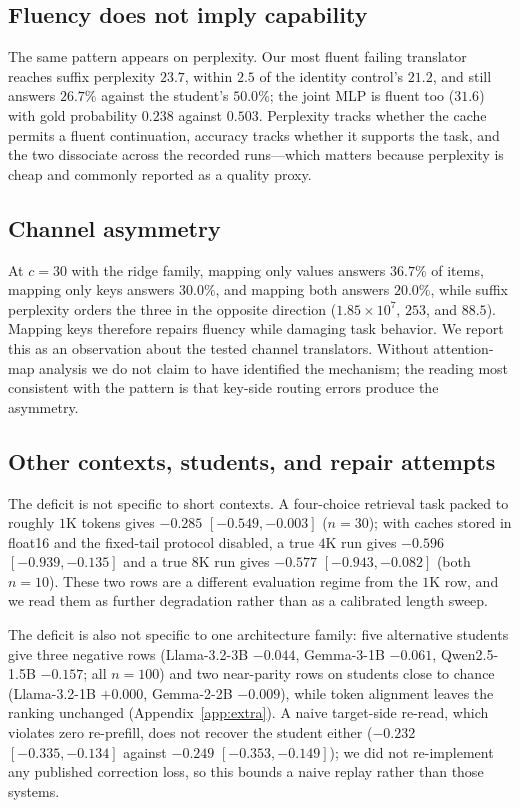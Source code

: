 \documentclass[10pt]{article}
\begin{document}
\subsection{Fluency does not imply capability}
The same pattern appears on perplexity. Our most fluent failing translator
reaches suffix perplexity $23.7$, within $2.5$ of the identity control's $21.2$,
and still answers $26.7\%$ against the student's $50.0\%$; the joint MLP is
fluent too ($31.6$) with gold probability $0.238$ against $0.503$. Perplexity
tracks whether the cache permits a fluent continuation, accuracy tracks whether
it supports the task, and the two dissociate across the recorded runs---which
matters because perplexity is cheap and commonly reported as a quality proxy.

\subsection{Channel asymmetry}
At $c{=}30$ with the ridge family, mapping only values answers $36.7\%$ of
items, mapping only keys answers $30.0\%$, and mapping both answers $20.0\%$,
while suffix perplexity orders the three in the opposite direction
($1.85\times10^{7}$, $253$, and $88.5$). Mapping keys therefore repairs fluency
while damaging task behavior. We report this as an observation about the tested
channel translators. Without attention-map analysis we do not claim to have
identified the mechanism; the reading most consistent with the pattern is that
key-side routing errors produce the asymmetry.

\subsection{Other contexts, students, and repair attempts}
The deficit is not specific to short contexts. A four-choice retrieval task
packed to roughly $1$K tokens gives $-0.285$ $[-0.549,-0.003]$ ($n{=}30$);
with caches stored in float16 and the fixed-tail protocol disabled, a true
$4$K run gives $-0.596$ $[-0.939,-0.135]$ and a true $8$K run gives $-0.577$
$[-0.943,-0.082]$ (both $n{=}10$). These two rows are a different evaluation
regime from the $1$K row, and we read them as further degradation rather than as
a calibrated length sweep.

The deficit is also not specific to one architecture family: five alternative
students give three negative rows (Llama-3.2-3B $-0.044$, Gemma-3-1B $-0.061$,
Qwen2.5-1.5B $-0.157$; all $n{=}100$) and two near-parity rows on students
close to chance (Llama-3.2-1B $+0.000$, Gemma-2-2B $-0.009$), while token
alignment leaves the ranking unchanged (Appendix~\ref{app:extra}). A naive
target-side re-read, which violates zero re-prefill, does not recover the
student either ($-0.232$ $[-0.335,-0.134]$ against $-0.249$ $[-0.353,-0.149]$);
we did not re-implement any published correction loss, so this bounds a naive
replay rather than those systems.
\end{document}
